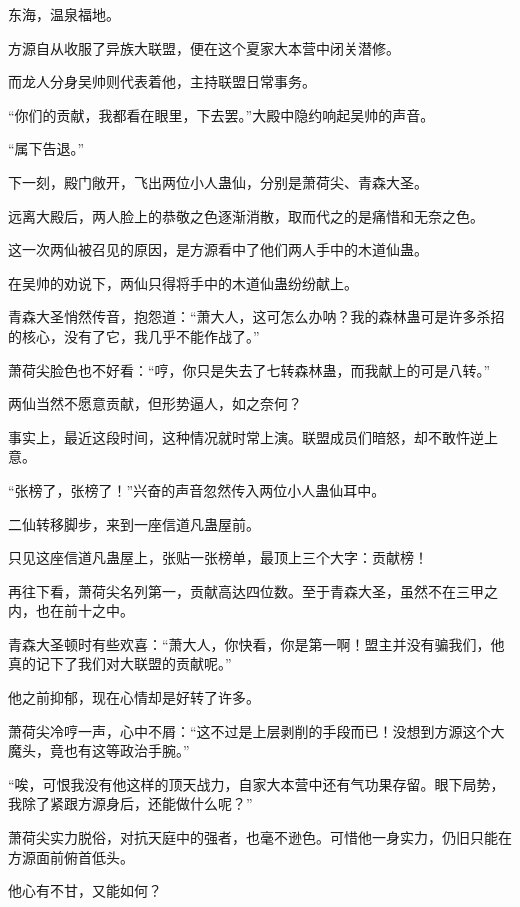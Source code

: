 
\begin{this_body}

东海，温泉福地。

方源自从收服了异族大联盟，便在这个夏家大本营中闭关潜修。

而龙人分身吴帅则代表着他，主持联盟日常事务。

“你们的贡献，我都看在眼里，下去罢。”大殿中隐约响起吴帅的声音。

“属下告退。”

下一刻，殿门敞开，飞出两位小人蛊仙，分别是萧荷尖、青森大圣。

远离大殿后，两人脸上的恭敬之色逐渐消散，取而代之的是痛惜和无奈之色。

这一次两仙被召见的原因，是方源看中了他们两人手中的木道仙蛊。

在吴帅的劝说下，两仙只得将手中的木道仙蛊纷纷献上。

青森大圣悄然传音，抱怨道：“萧大人，这可怎么办呐？我的森林蛊可是许多杀招的核心，没有了它，我几乎不能作战了。”

萧荷尖脸色也不好看：“哼，你只是失去了七转森林蛊，而我献上的可是八转。”

两仙当然不愿意贡献，但形势逼人，如之奈何？

事实上，最近这段时间，这种情况就时常上演。联盟成员们暗怒，却不敢忤逆上意。

“张榜了，张榜了！”兴奋的声音忽然传入两位小人蛊仙耳中。

二仙转移脚步，来到一座信道凡蛊屋前。

只见这座信道凡蛊屋上，张贴一张榜单，最顶上三个大字：贡献榜！

再往下看，萧荷尖名列第一，贡献高达四位数。至于青森大圣，虽然不在三甲之内，也在前十之中。

青森大圣顿时有些欢喜：“萧大人，你快看，你是第一啊！盟主并没有骗我们，他真的记下了我们对大联盟的贡献呢。”

他之前抑郁，现在心情却是好转了许多。

萧荷尖冷哼一声，心中不屑：“这不过是上层剥削的手段而已！没想到方源这个大魔头，竟也有这等政治手腕。”

“唉，可恨我没有他这样的顶天战力，自家大本营中还有气功果存留。眼下局势，我除了紧跟方源身后，还能做什么呢？”

萧荷尖实力脱俗，对抗天庭中的强者，也毫不逊色。可惜他一身实力，仍旧只能在方源面前俯首低头。

他心有不甘，又能如何？


\end{this_body}

